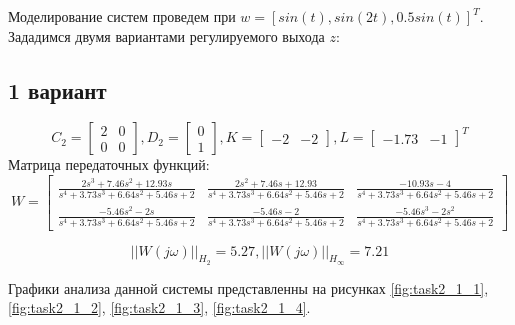 Моделирование систем проведем при $w = [sin(t), sin(2t), 0.5sin(t)]^T$.
Зададимся двумя вариантами регулируемого выхода $z$:
\subsection{1 вариант}
\begin{equation*}
    C_2 = \begin{bmatrix}
        2 & 0 \\
        0 & 0
    \end{bmatrix}, 
    D_2 = \begin{bmatrix}
        0 \\ 1
    \end{bmatrix},
    K = \begin{bmatrix}
        -2 & -2
    \end{bmatrix},
    L = \begin{bmatrix}
        -1.73 & -1
    \end{bmatrix}^T
\end{equation*}
Матрица передаточных функций:
\begin{equation*}
    W = 
    \begin{bmatrix}
        \frac{2s^3+7.46s^2+12.93s}{s^4 + 3.73s^3 +6.64s^2 + 5.46s + 2} & \frac{2s^2+7.46s+12.93}{s^4 + 3.73s^3 +6.64s^2 + 5.46s + 2} & \frac{-10.93s -4}{s^4 + 3.73s^3 +6.64s^2 + 5.46s + 2} \\
        \frac{-5.46s^2-2s}{s^4 + 3.73s^3 +6.64s^2 + 5.46s + 2} & \frac{-5.46s -2}{s^4 + 3.73s^3 +6.64s^2 + 5.46s + 2} & \frac{-5.46s^3-2s^2}{s^4 + 3.73s^3 +6.64s^2 + 5.46s + 2}
    \end{bmatrix}
\end{equation*}

\begin{equation*}
    ||W(j\omega)||_{H_2} = 5.27, ||W(j\omega)||_{H_\infty} = 7.21
\end{equation*}

Графики анализа данной системы представленны на рисунках \ref{fig:task2_1_1}, \ref{fig:task2_1_2}, \ref{fig:task2_1_3}, \ref{fig:task2_1_4}.

